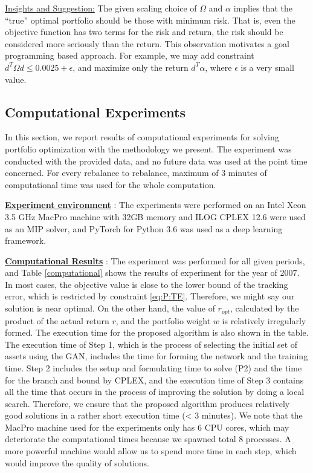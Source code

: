 \documentclass[11pt]{article}
\begin{document}
	
	\underline{Insights and Suggestion:} The given scaling choice of $\Omega$ and $\alpha$ implies that the ``true'' optimal portfolio should be those with minimum risk. That is, even the objective function has two terms for the risk and return, the risk should be considered more seriously than the return. This observation motivates a goal programming based approach. For example, we may add constraint $d^T \Omega d \le 0.0025 + \epsilon$, and maximize only the return $d^T \alpha$, where $\epsilon$ is a very small value.
	
	
	
	
	
	
	
	\subsection{Computational Experiments}
	In this section, we report results of computational experiments for solving portfolio optimization with the methodology we present. 
	The experiment was conducted with the provided data, and no future data was used at the point time concerned. For every rebalance to rebalance, maximum of 3 minutes of computational time was used for the whole computation. 
	
	\underline{\textbf{Experiment environment}} : The experiments were performed on an Intel Xeon 3.5 GHz MacPro machine with 32GB memory and ILOG CPLEX 12.6 were used as an MIP solver, and PyTorch for Python 3.6 was used as a deep learning framework. 
	
	\underline{\textbf{Computational Results}} : The experiment was performed for all given periods, and Table \ref{computational} shows the results of experiment for the year of 2007. In most cases, the objective value is close to the lower bound of the tracking error, which is restricted by constraint \eqref{eq:P:TE}. Therefore, we might say our solution is near optimal. On the other hand, the value of $ r_{opt}$, calculated by the product of the actual return $r$, and the portfolio weight $w$ is relatively irregularly formed. The execution time for the proposed algorithm is also shown in the table. The execution time of Step 1, which is the process of selecting the initial set of assets using the GAN, includes the time for forming the network and the training time. Step 2 includes the setup and formulating time to solve (P2) and the time for the branch and bound by CPLEX, and the execution time of Step 3 contains all the time that occurs in the process of improving the solution by doing a local search. Therefore, we ensure that the proposed algorithm produces relatively good solutions in a rather short execution time (< 3 minutes). We note that the MacPro machine used for the experiments only has 6 CPU cores, which may deteriorate the computational times because we spawned total 8 processes. A more powerful machine would allow us to spend more time in each step, which would improve the quality of solutions.
	
\end{document}
